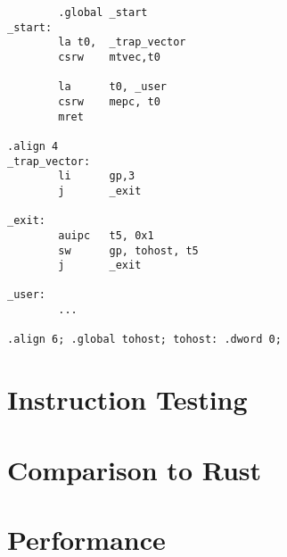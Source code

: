 \begin{verbatim}
        .global _start
_start:
        la t0,  _trap_vector
        csrw	mtvec,t0

        la      t0, _user
        csrw    mepc, t0
        mret

.align 4
_trap_vector:
        li      gp,3
        j       _exit

_exit:
        auipc   t5, 0x1
        sw      gp, tohost, t5
        j       _exit

_user:
        ...

.align 6; .global tohost; tohost: .dword 0;
\end{verbatim}

\section{Instruction Testing}

\section{Comparison to Rust}

\section{Performance}
